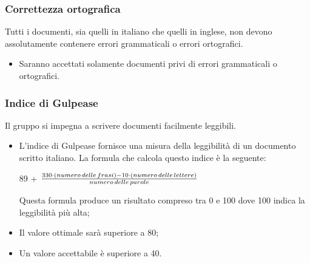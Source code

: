	\subsubsection{Correttezza ortografica}
	Tutti i documenti, sia quelli in italiano che quelli in inglese, non devono assolutamente contenere errori grammaticali o errori ortografici. 
	\begin{itemize}
		\item Saranno accettati solamente documenti privi di errori grammaticali o ortografici.
	\end{itemize}
	\subsubsection{Indice di Gulpease}
	Il gruppo si impegna a scrivere documenti facilmente leggibili.
	\begin{itemize}
	\item L'indice di Gulpease fornisce una misura della leggibilità di un documento scritto italiano. La formula che calcola questo indice è la seguente:\\
	\centerline{ 89 + \(\frac{ {330 \cdot (numero \thinspace delle \thinspace frasi) - 10 \cdot (numero \thinspace delle \thinspace lettere)}}{numero \thinspace delle \thinspace parole} \)} 
	Questa formula produce un risultato compreso tra 0 e 100 dove 100 indica la leggibilità più alta;
	\item Il valore ottimale sarà superiore a 80;
	\item Un valore accettabile è superiore a 40.
	\end{itemize}

		

